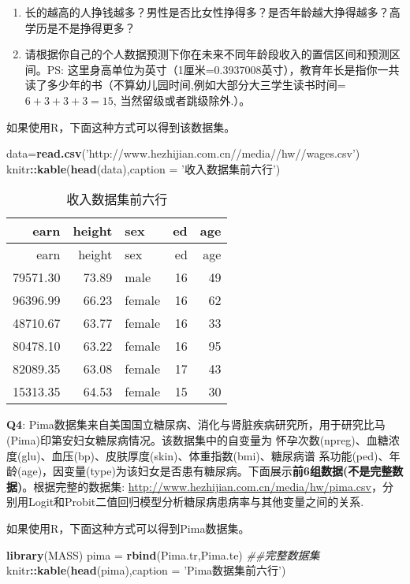 \documentclass[]{article}
\newenvironment{Shaded}{\begin{snugshade}}{\end{snugshade}}
\newcommand{\CommentTok}[1]{\textcolor[rgb]{0.56,0.35,0.01}{\textit{#1}}}
\newcommand{\DataTypeTok}[1]{\textcolor[rgb]{0.13,0.29,0.53}{#1}}
\newcommand{\KeywordTok}[1]{\textcolor[rgb]{0.13,0.29,0.53}{\textbf{#1}}}
\newcommand{\NormalTok}[1]{#1}
\newcommand{\OperatorTok}[1]{\textcolor[rgb]{0.81,0.36,0.00}{\textbf{#1}}}
\newcommand{\StringTok}[1]{\textcolor[rgb]{0.31,0.60,0.02}{#1}}
\providecommand{\tightlist}{%
  \setlength{\itemsep}{0pt}\setlength{\parskip}{0pt}}
\begin{document}
\begin{enumerate}
\def\labelenumi{\arabic{enumi}.}
\tightlist
\item
  长的越高的人挣钱越多？男性是否比女性挣得多？是否年龄越大挣得越多？高学历是不是挣得更多？
\item
  请根据你自己的个人数据预测下你在未来不同年龄段收入的置信区间和预测区间。PS:
  这里身高单位为英寸（1厘米=0.3937008英寸），教育年长是指你一共读了多少年的书（不算幼儿园时间,例如大部分大三学生读书时间=\(6+3+3+3=15\),
  当然留级或者跳级除外.）。
\end{enumerate}

如果使用R，下面这种方式可以得到该数据集。

\begin{Shaded}
\begin{Highlighting}[]
\NormalTok{data=}\KeywordTok{read.csv}\NormalTok{(}\StringTok{'http://www.hezhijian.com.cn//media//hw//wages.csv'}\NormalTok{)}
\NormalTok{knitr}\OperatorTok{::}\KeywordTok{kable}\NormalTok{(}\KeywordTok{head}\NormalTok{(data),}\DataTypeTok{caption =} \StringTok{'收入数据集前六行'}\NormalTok{)}
\end{Highlighting}
\end{Shaded}

\begin{longtable}[]{@{}rrlrr@{}}
\caption{收入数据集前六行}\tabularnewline
\toprule
earn & height & sex & ed & age\tabularnewline
\midrule
\endfirsthead
\toprule
earn & height & sex & ed & age\tabularnewline
\midrule
\endhead
79571.30 & 73.89 & male & 16 & 49\tabularnewline
96396.99 & 66.23 & female & 16 & 62\tabularnewline
48710.67 & 63.77 & female & 16 & 33\tabularnewline
80478.10 & 63.22 & female & 16 & 95\tabularnewline
82089.35 & 63.08 & female & 17 & 43\tabularnewline
15313.35 & 64.53 & female & 15 & 30\tabularnewline
\bottomrule
\end{longtable}

\textbf{Q4}:
Pima数据集来自美国国立糖尿病、消化与肾脏疾病研究所，用于研究比马(Pima)印第安妇女糖尿病情况。该数据集中的自变量为
怀孕次数(npreg)、血糖浓度(glu)、血压(bp)、皮肤厚度(skin)、体重指数(bmi)、糖尿病谱
系功能(ped)、年龄(age)，因变量(type)为该妇女是否患有糖尿病。下面展示\textbf{前6组数据(不是完整数据)}。根据完整的数据集:
\url{http://www.hezhijian.com.cn/media/hw/pima.csv}，分别用Logit和Probit二值回归模型分析糖尿病患病率与其他变量之间的关系.

如果使用R，下面这种方式可以得到Pima数据集。

\begin{Shaded}
\begin{Highlighting}[]
\KeywordTok{library}\NormalTok{(MASS)}
\NormalTok{pima =}\StringTok{ }\KeywordTok{rbind}\NormalTok{(Pima.tr,Pima.te) }\CommentTok{##完整数据集}
\NormalTok{knitr}\OperatorTok{::}\KeywordTok{kable}\NormalTok{(}\KeywordTok{head}\NormalTok{(pima),}\DataTypeTok{caption =} \StringTok{'Pima数据集前六行'}\NormalTok{)}
\end{Highlighting}
\end{Shaded}
\end{document}
